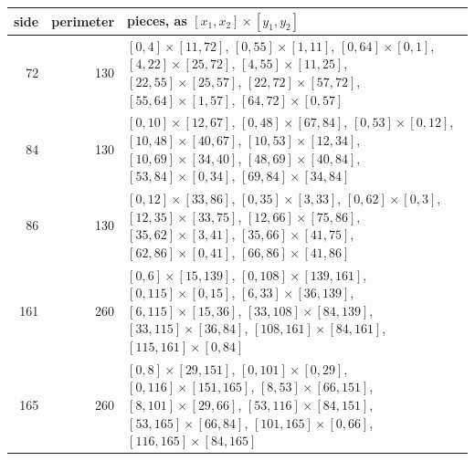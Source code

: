 \begin{tabular}{@{}rrl@{}}
\toprule
side & perimeter & pieces, as $[x_1,x_2]\times[y_1,y_2]$ \\
\midrule
72 & 130 & \parbox[t]{0.74\textwidth}{\raggedright $[0,4]\times[11,72]$, $[0,55]\times[1,11]$, $[0,64]\times[0,1]$, $[4,22]\times[25,72]$, $[4,55]\times[11,25]$, $[22,55]\times[25,57]$, $[22,72]\times[57,72]$, $[55,64]\times[1,57]$, $[64,72]\times[0,57]$}\\[3pt]
84 & 130 & \parbox[t]{0.74\textwidth}{\raggedright $[0,10]\times[12,67]$, $[0,48]\times[67,84]$, $[0,53]\times[0,12]$, $[10,48]\times[40,67]$, $[10,53]\times[12,34]$, $[10,69]\times[34,40]$, $[48,69]\times[40,84]$, $[53,84]\times[0,34]$, $[69,84]\times[34,84]$}\\[3pt]
86 & 130 & \parbox[t]{0.74\textwidth}{\raggedright $[0,12]\times[33,86]$, $[0,35]\times[3,33]$, $[0,62]\times[0,3]$, $[12,35]\times[33,75]$, $[12,66]\times[75,86]$, $[35,62]\times[3,41]$, $[35,66]\times[41,75]$, $[62,86]\times[0,41]$, $[66,86]\times[41,86]$}\\[3pt]
161 & 260 & \parbox[t]{0.74\textwidth}{\raggedright $[0,6]\times[15,139]$, $[0,108]\times[139,161]$, $[0,115]\times[0,15]$, $[6,33]\times[36,139]$, $[6,115]\times[15,36]$, $[33,108]\times[84,139]$, $[33,115]\times[36,84]$, $[108,161]\times[84,161]$, $[115,161]\times[0,84]$}\\[3pt]
165 & 260 & \parbox[t]{0.74\textwidth}{\raggedright $[0,8]\times[29,151]$, $[0,101]\times[0,29]$, $[0,116]\times[151,165]$, $[8,53]\times[66,151]$, $[8,101]\times[29,66]$, $[53,116]\times[84,151]$, $[53,165]\times[66,84]$, $[101,165]\times[0,66]$, $[116,165]\times[84,165]$}\\[3pt]
\bottomrule
\end{tabular}
